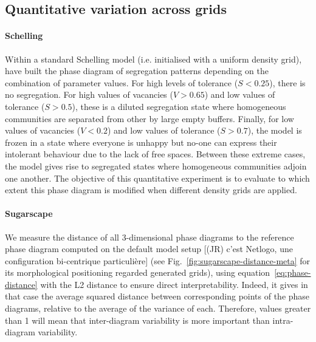 \documentclass[Royal,sageh,times]{sagej}
\begin{document}
\subsection{Quantitative variation across grids}
\paragraph{Schelling} 
Within a standard Schelling model (i.e. initialised with a uniform density grid), \citet{Gauvinetal2009} have built the phase diagram of segregation patterns depending on the combination of parameter values. For high levels of tolerance ($S < 0.25$), there is no segregation. For high values of vacancies ($V > 0.65$) and low values of tolerance ($S > 0.5$), these is a diluted segregation state where homogeneous communities are separated from other by large empty buffers. Finally, for low values of vacancies ($V < 0.2$) and low values of tolerance ($S > 0.7$), the model is frozen in a state where everyone is unhappy but no-one can express their intolerant behaviour due to the lack of free spaces. Between these extreme cases, the model gives rise to segregated states where homogeneous communities adjoin one another. The objective of this quantitative experiment is to evaluate to which extent this phase diagram is modified when different density grids are applied. 


\paragraph{Sugarscape} We measure the distance of all 3-dimensional phase diagrams to the reference phase diagram computed on the default model setup [(JR) c'est Netlogo, une configuration bi-centrique particulière] (see Fig.~\ref{fig:sugarscape-distance-meta} for its morphological positioning regarded generated grids), using equation~\ref{eq:phase-distance} with the L2 distance to ensure direct interpretability.  Indeed, it gives in that case the average squared distance between corresponding points of the phase diagrams, relative to the average of the variance of each. Therefore, values greater than 1 will mean that inter-diagram variability is more important than intra-diagram variability.
\end{document}
